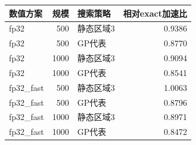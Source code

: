 \begin{tabular}{@{}lr lr@{}}
\toprule
数值方案 & 规模 & 搜索策略 & 相对exact加速比 \\ \midrule
fp32 & 500 & 静态区域3 & 0.9386 \\
fp32 & 500 & GP代表 & 0.8770 \\
fp32 & 1000 & 静态区域3 & 0.9094 \\
fp32 & 1000 & GP代表 & 0.8541 \\
fp32\_fast & 500 & 静态区域3 & 1.0063 \\
fp32\_fast & 500 & GP代表 & 0.8796 \\
fp32\_fast & 1000 & 静态区域3 & 0.8971 \\
fp32\_fast & 1000 & GP代表 & 0.8472 \\
\bottomrule
\end{tabular}
